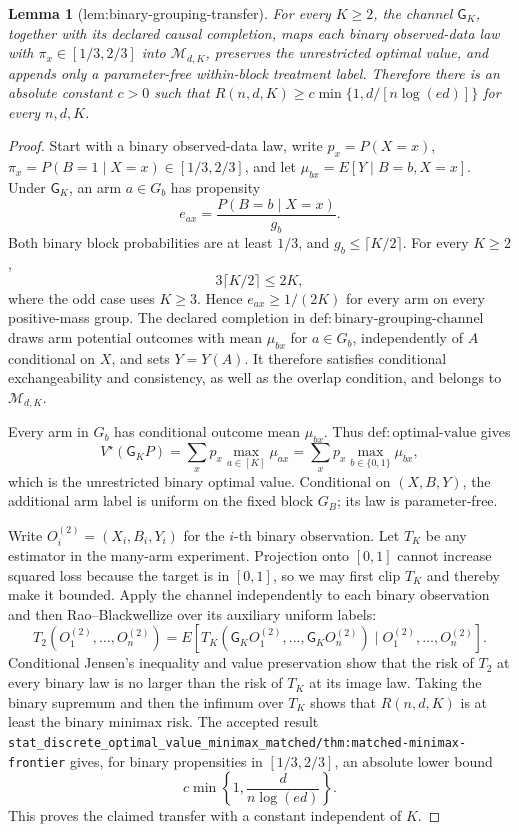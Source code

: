 \documentclass{article}
\newtheorem{lemma}{Lemma}
\begin{document}
\begin{lemma}[lem:binary-grouping-transfer]\label{lem:binary-grouping-transfer}
For every \(K\ge2\), the channel \(\mathsf G_K\), together with its declared causal completion, maps each binary observed-data law with \(\pi_x\in[1/3,2/3]\) into \(\mathcal M_{d,K}\), preserves the unrestricted optimal value, and appends only a parameter-free within-block treatment label. Therefore there is an absolute constant \(c>0\) such that \(R(n,d,K)\ge c\min\{1,d/[n\log(ed)]\}\) for every \(n,d,K\).
\end{lemma}
\begin{proof}
Start with a binary observed-data law, write \(p_x=P(X=x)\), \(\pi_x=P(B=1\mid X=x)\in[1/3,2/3]\), and let \(\mu_{bx}=E[Y\mid B=b,X=x]\).  Under \(\mathsf G_K\), an arm \(a\in G_b\) has propensity
\[
 e_{ax}=\frac{P(B=b\mid X=x)}{g_b}.
\]
Both binary block probabilities are at least \(1/3\), and \(g_b\leq\lceil K/2\rceil\).  For every \(K\geq2\),
\[
 3\lceil K/2\rceil\leq2K,
\]
where the odd case uses \(K\geq3\).  Hence \(e_{ax}\geq1/(2K)\) for every arm on every positive-mass group.  The declared completion in \(\mathrm{def{:}binary\text{-}grouping\text{-}channel}\) draws arm potential outcomes with mean \(\mu_{bx}\) for \(a\in G_b\), independently of \(A\) conditional on \(X\), and sets \(Y=Y(A)\).  It therefore satisfies conditional exchangeability and consistency, as well as the overlap condition, and belongs to \(\mathcal M_{d,K}\).

Every arm in \(G_b\) has conditional outcome mean \(\mu_{bx}\).  Thus \(\mathrm{def{:}optimal\text{-}value}\) gives
\[
 V^\star(\mathsf G_KP)
 =\sum_xp_x\max_{a\in[K]}\mu_{ax}
 =\sum_xp_x\max_{b\in\{0,1\}}\mu_{bx},
\]
which is the unrestricted binary optimal value.  Conditional on \((X,B,Y)\), the additional arm label is uniform on the fixed block \(G_B\); its law is parameter-free.

Write \(O_i^{(2)}=(X_i,B_i,Y_i)\) for the \(i\)-th binary observation.  Let \(T_K\) be any estimator in the many-arm experiment.  Projection onto \([0,1]\) cannot increase squared loss because the target is in \([0,1]\), so we may first clip \(T_K\) and thereby make it bounded.  Apply the channel independently to each binary observation and then Rao--Blackwellize over its auxiliary uniform labels:
\[
 T_2(O_1^{(2)},\ldots,O_n^{(2)})
 =E[T_K(\mathsf G_KO_1^{(2)},\ldots,\mathsf G_KO_n^{(2)})
       \mid O_1^{(2)},\ldots,O_n^{(2)}].
\]
Conditional Jensen's inequality and value preservation show that the risk of \(T_2\) at every binary law is no larger than the risk of \(T_K\) at its image law.  Taking the binary supremum and then the infimum over \(T_K\) shows that \(R(n,d,K)\) is at least the binary minimax risk.  The accepted result \texttt{stat\_discrete\_optimal\_value\_minimax\_matched/thm:matched-minimax-frontier} gives, for binary propensities in \([1/3,2/3]\), an absolute lower bound
\[
 c\min\left\{1,\frac{d}{n\log(ed)}\right\}.
\]
This proves the claimed transfer with a constant independent of \(K\).
\end{proof}
\end{document}
